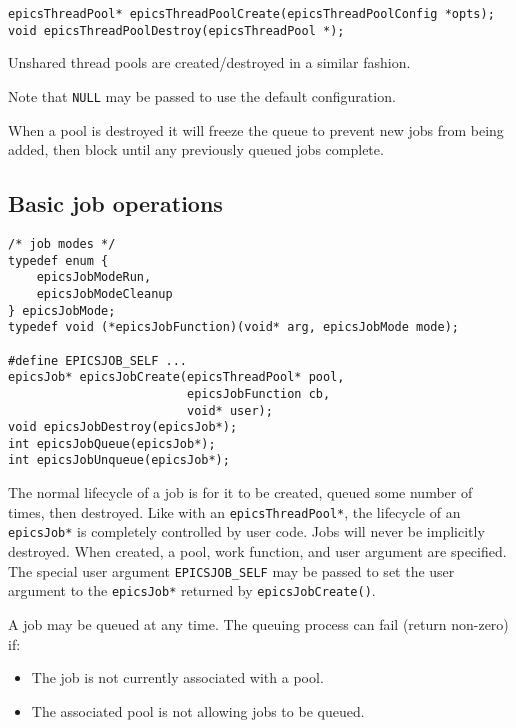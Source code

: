\begin{verbatim}
epicsThreadPool* epicsThreadPoolCreate(epicsThreadPoolConfig *opts);
void epicsThreadPoolDestroy(epicsThreadPool *);
\end{verbatim}



Unshared thread pools are created/destroyed in a similar fashion.

Note that \verb|NULL| may be passed to use the default configuration.

When a pool is destroyed it will freeze the queue to prevent new jobs
from being added, then block until any previously queued jobs complete.

\subsection{Basic job operations}

\begin{verbatim}
/* job modes */
typedef enum {
    epicsJobModeRun,
    epicsJobModeCleanup
} epicsJobMode;
typedef void (*epicsJobFunction)(void* arg, epicsJobMode mode);

#define EPICSJOB_SELF ...
epicsJob* epicsJobCreate(epicsThreadPool* pool,
                         epicsJobFunction cb,
                         void* user);
void epicsJobDestroy(epicsJob*);
int epicsJobQueue(epicsJob*);
int epicsJobUnqueue(epicsJob*);
\end{verbatim}



The normal lifecycle of a job is for it to be created, queued some number of
times, then destroyed. Like with an \verb|epicsThreadPool*|, the lifecycle of
an \verb|epicsJob*| is completely controlled by user code. Jobs will never
be implicitly destroyed. When created, a pool, work function, and
user argument are specified. The special user argument \verb|EPICSJOB_SELF|
may be passed to set the user argument to the \verb|epicsJob*| returned
by \verb|epicsJobCreate()|.

A job may be queued at any time. The queuing process can fail (return
non-zero) if:

\begin{itemize}
\item The job is not currently associated with a pool.
\item The associated pool is not allowing jobs to be queued.
\end{itemize}

